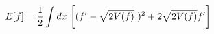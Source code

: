 \begin{equation}
E[f] = {1\over 2}\int dx ~ \biggl [ (f' - \sqrt{2V(f)} ~ )^2
                         + 2\sqrt{2V(f)} f' \biggr ]
\label{towardsbogo}
\end{equation}

